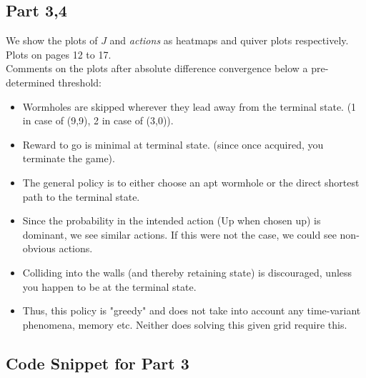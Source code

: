 \subsection{Part 3,4}

We show the plots of $J$ and \textit{actions} as heatmaps and quiver plots respectively. \\

Plots on pages 12 to 17. \\

Comments on the plots after absolute difference convergence below a pre-determined threshold:
\begin{itemize}
\item  Wormholes are skipped wherever they lead away from the terminal state. (1 in case of (9,9), 2 in case of (3,0)).
\item  Reward to go is minimal at terminal state. (since once acquired, you terminate the game).
\item  The general policy is to either choose an apt wormhole or the direct shortest path to the terminal state.
\item  Since the probability in the intended action (Up when chosen up) is dominant, we see similar actions. If this were not the case, we could see non-obvious actions.
\item Colliding into the walls (and thereby retaining state) is discouraged, unless you happen to be at the terminal state.
\item Thus, this policy is "greedy" and does not take into account any time-variant phenomena, memory etc. Neither does solving this given grid require this.
\end{itemize}

\subsection{Code Snippet for Part 3}

